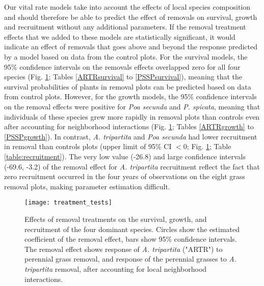 \documentclass[11pt]{article}
\begin{document}
\begin{doublespacing}
Our vital rate models take into account the effects of local species composition and should therefore be able to predict the effect of removals on survival, growth and recruitment without any additional parameters. If the removal treatment effects that we added to these models are statistically significant, it would indicate an effect of removals that goes above and beyond the response predicted by a model based on data from the control plots. For the survival models, the 95\% confidence intervals on the removals effects overlapped zero for all four species (Fig. \ref{fig:VitalRateTest}; Tables \ref{ARTRsurvival} to \ref{PSSPsurvival}), meaning that the survival probabilities of plants in removal plots can be predicted based on data from control plots. However, for the growth models, the 95\% confidence intervals on the removal effects were positive for \textit{Poa secunda}  and \textit{P. spicata}, meaning that individuals of these species grew more rapidly in removal plots than controls even after accounting for neighborhood interactions (Fig. \ref{fig:VitalRateTest}; Tables \ref{ARTRgrowth} to \ref{PSSPgrowth}). In contrast, \textit{A. tripartita} and  \textit{Poa secunda} had lower recruitment in removal than controls plots (upper limit of 95\% CI $<0$; Fig. \ref{fig:VitalRateTest}; Table \ref{table:recruitment}). The very low value (-26.8) and large confidence intervals (-69.6, -3.2) of the removal effect for  \textit{A. tripartita} recruitment reflect the fact that zero recruitment occurred in the four years of observations on the eight grass removal plots, making parameter estimation difficult.

 \begin{figure}[tbp]
 \centering
 \texttt{[image: treatment\_tests]}
 \caption{Effects of removal treatments on the survival, growth, and recruitment of the four dominant species. Circles show the estimated coefficient of the removal effect, bars show 95\% confidence intervals. The removal effect shows response of \textit{A. tripartita} ("ARTR") to perennial grass removal, and response of the perennial grasses to \textit{A. tripartita} removal, after accounting for local neighborhood interactions. }
 \label{fig:VitalRateTest}
 \end{figure}


\end{doublespacing}
\end{document}
